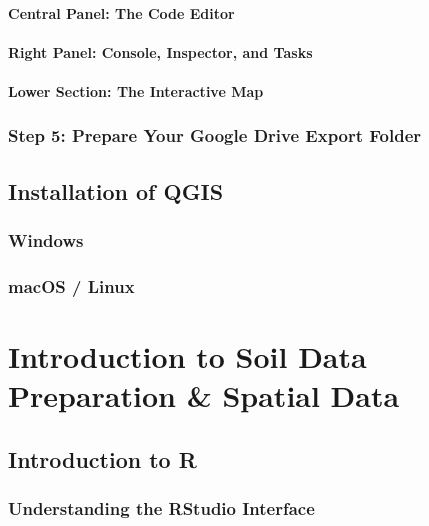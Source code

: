 \documentclass[
  10pt,
  b5paper,
  oneside]{book}
\begin{document}
\subsubsection{Central Panel: The Code Editor}\label{central-panel-the-code-editor}

\subsubsection{Right Panel: Console, Inspector, and Tasks}\label{right-panel-console-inspector-and-tasks}

\subsubsection{Lower Section: The Interactive Map}\label{lower-section-the-interactive-map}

\subsection{Step 5: Prepare Your Google Drive Export Folder}\label{step-5-prepare-your-google-drive-export-folder}

\section*{Installation of QGIS}\label{installation-of-qgis}

\subsection{Windows}\label{windows}

\subsection{macOS / Linux}\label{macos-linux}

\chapter{Introduction to Soil Data Preparation \& Spatial Data}\label{introduction-to-soil-data-preparation-spatial-data}

\section{Introduction to R}\label{introduction-to-r}

\subsection{Understanding the RStudio Interface}\label{understanding-the-rstudio-interface}
\end{document}
